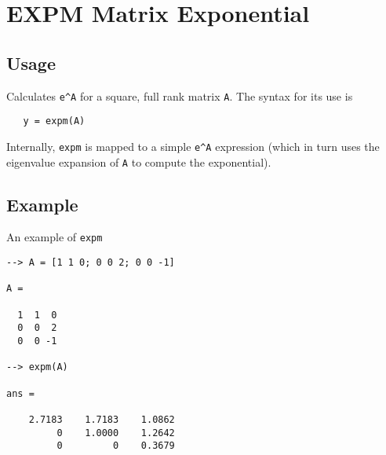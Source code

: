 \section{EXPM Matrix Exponential}

\subsection{Usage}

Calculates \verb|e^A| for a square, full rank matrix \verb|A|.  The
syntax for its use is
\begin{verbatim}
   y = expm(A)
\end{verbatim}
Internally, \verb|expm| is mapped to a simple \verb|e^A| expression (which
in turn uses the eigenvalue expansion of \verb|A| to compute the
exponential).
\subsection{Example}

An example of \verb|expm|
\begin{verbatim}
--> A = [1 1 0; 0 0 2; 0 0 -1]

A = 

  1  1  0 
  0  0  2 
  0  0 -1 

--> expm(A)

ans = 

    2.7183    1.7183    1.0862 
         0    1.0000    1.2642 
         0         0    0.3679 
\end{verbatim}
